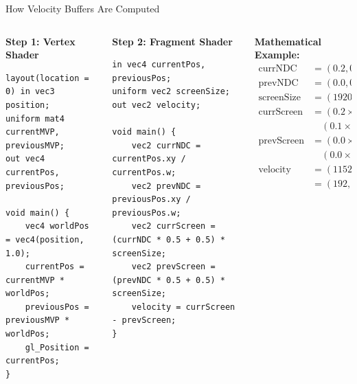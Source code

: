 \documentclass[aspectratio=169]{beamer}
\begin{document}
\begin{frame}[fragile,shrink=2]{How Velocity Buffers Are Computed}
    
    \begin{columns}[t]
        \begin{column}{0.36\textwidth} 
            \textbf{Step 1: Vertex Shader}
            \begin{lstlisting}[style=glslstyle, basicstyle=\tiny\ttfamily, numbers=none, backgroundcolor=\color{blue!8}, frame=single]
layout(location = 0) in vec3 position;
uniform mat4 currentMVP, previousMVP;
out vec4 currentPos, previousPos;

void main() {
    vec4 worldPos = vec4(position, 1.0);
    currentPos = currentMVP * worldPos;
    previousPos = previousMVP * worldPos;
    gl_Position = currentPos;
}
            \end{lstlisting}
        \end{column}
        
        \begin{column}{0.30\textwidth}  
            \textbf{Step 2: Fragment Shader}
            \begin{lstlisting}[style=glslstyle, basicstyle=\tiny\ttfamily, numbers=none, backgroundcolor=\color{green!8}, frame=single]
in vec4 currentPos, previousPos;
uniform vec2 screenSize;  
out vec2 velocity;

void main() {
    vec2 currNDC = currentPos.xy / currentPos.w;
    vec2 prevNDC = previousPos.xy / previousPos.w;
    vec2 currScreen = (currNDC * 0.5 + 0.5) * screenSize;
    vec2 prevScreen = (prevNDC * 0.5 + 0.5) * screenSize;
    velocity = currScreen - prevScreen;
}
            \end{lstlisting}
        \end{column}
        
        \begin{column}{0.36\textwidth} 
            \textbf{\scriptsize Mathematical Example:}
            \vspace{0.1cm}
            {\scriptsize
            \begin{align*}
                \text{currNDC} &= (0.2, 0.1) \\
                \text{prevNDC} &= (0.0, 0.0) \\
                \text{screenSize} &= (1920, 1080) \\[0.05cm]
                \text{currScreen} &= (0.2 \times 0.5 + 0.5) \times 1920 = 1152 \\
                &\quad (0.1 \times 0.5 + 0.5) \times 1080 = 594 \\[0.05cm]
                \text{prevScreen} &= (0.0 \times 0.5 + 0.5) \times 1920 = 960 \\
                &\quad (0.0 \times 0.5 + 0.5) \times 1080 = 540 \\[0.05cm]
                \text{velocity} &= (1152, 594) - (960, 540) \\
                &= (192, 54) \text{ pixels}
            \end{align*}
            }
        \end{column}
    \end{columns}
    

\end{frame}
\end{document}
